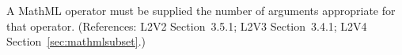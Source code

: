 A MathML operator must be supplied the number of arguments appropriate for
that operator.  (References: L2V2 Section~3.5.1; L2V3 Section~3.4.1; 
L2V4 Section~\ref{sec:mathmlsubset}.)
